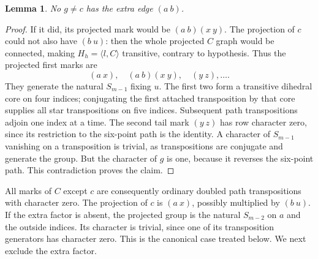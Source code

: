 \documentclass[11pt,a4paper]{article}
\newtheorem{lemma}{Lemma}
\newcommand{\gen}[1]{\langle#1\rangle}
\begin{document}
\begin{lemma}\label{tailtwist}
No $g\ne c$ has the extra edge $(a\ b)$.
\end{lemma}
\begin{proof}
If it did, its projected mark would be $(a\ b)(x\ y)$.
The projection of $c$ could not also have $(b\ u)$: then the
whole projected $C$ graph would be connected, making
$H_h=\gen{l,C}$ transitive, contrary to hypothesis. Thus the
projected first marks are
\[
                  (a\ x),\quad(a\ b)(x\ y),\quad(y\ z),\ldots.
\]
They generate the natural $S_{m-1}$ fixing $u$. The first two
form a transitive dihedral core on four indices; conjugating the
first attached transposition by that core supplies all star
transpositions on five indices. Subsequent path transpositions
adjoin one index at a time. The second tail mark $(y\ z)$ has
row character zero, since its restriction to the six-point path
is the identity. A character of $S_{m-1}$ vanishing on a transposition
is trivial, as transpositions are conjugate and generate the group.
But the character of $g$ is one, because it reverses the six-point
path. This contradiction proves the claim.
\end{proof}

All marks of $C$ except $c$ are consequently ordinary doubled path
transpositions with character zero. The projection of $c$ is
$(a\ x)$, possibly multiplied by $(b\ u)$. If the extra factor
is absent, the projected group is the natural $S_{m-2}$ on $a$
and the outside indices. Its character is trivial, since one of
its transposition generators has character zero. This is the
canonical case treated below. We next exclude the extra factor.
\end{document}
